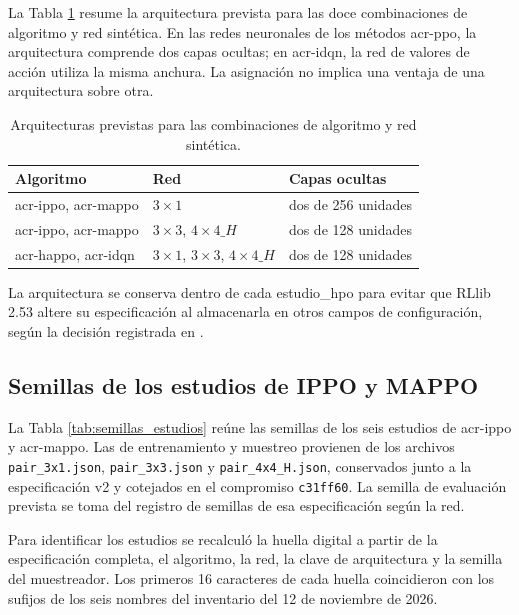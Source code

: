 La Tabla \ref{tab:arquitecturas_busqueda} resume la arquitectura prevista para las doce combinaciones de algoritmo y red sintética. En las redes neuronales de los métodos \acrshort{acr-ppo}, la arquitectura comprende dos capas ocultas; en \acrshort{acr-idqn}, la red de valores de acción utiliza la misma anchura. La asignación no implica una ventaja de una arquitectura sobre otra.

\begin{table}[H]\centering\small
\caption{Arquitecturas previstas para las combinaciones de algoritmo y red sintética.}\label{tab:arquitecturas_busqueda}
\begin{tabular}{>{\raggedright\arraybackslash}p{4.6cm}>{\raggedright\arraybackslash}p{2.6cm}>{\raggedright\arraybackslash}p{5.8cm}}\hline
\rowcolor{catAzulCielo!25}
Algoritmo & Red & Capas ocultas \\\hline
\acrshort{acr-ippo}, \acrshort{acr-mappo} & $3\times1$ & dos de 256 unidades \\
\acrshort{acr-ippo}, \acrshort{acr-mappo} & $3\times3$, $4\times4\_H$ & dos de 128 unidades \\
\acrshort{acr-happo}, \acrshort{acr-idqn} & $3\times1$, $3\times3$, $4\times4\_H$ & dos de 128 unidades \\
\hline
\end{tabular}\end{table}

La arquitectura se conserva dentro de cada \gls{estudio_hpo} para evitar que RLlib 2.53 altere su especificación al almacenarla en otros campos de configuración, según la decisión registrada en \allowbreak{}.

\subsection{Semillas de los estudios de IPPO y MAPPO}
\label{subsec:semillas_estudios}

La Tabla \ref{tab:semillas_estudios} reúne las semillas de los seis estudios de \acrshort{acr-ippo} y \acrshort{acr-mappo}. Las de entrenamiento y muestreo provienen de los archivos \texttt{pair\_3x1.json}, \texttt{pair\_3x3.json} y \texttt{pair\_4x4\_H.json}, conservados junto a la especificación v2 y cotejados en el compromiso \texttt{c31ff60}. La semilla de evaluación prevista se toma del registro de semillas de esa especificación según la red.

Para identificar los estudios se recalculó la huella digital a partir de la especificación completa, el algoritmo, la red, la clave de arquitectura y la semilla del muestreador. Los primeros 16 caracteres de cada huella coincidieron con los sufijos de los seis nombres del inventario del 12 de noviembre de 2026.

